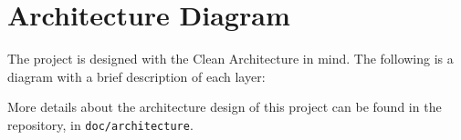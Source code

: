 \section{Architecture Diagram}

The project is designed with the Clean Architecture in mind.
The following is a diagram with a brief description of each layer:



More details about the architecture design of this project can be found in the repository, in \verb|doc/architecture|.


